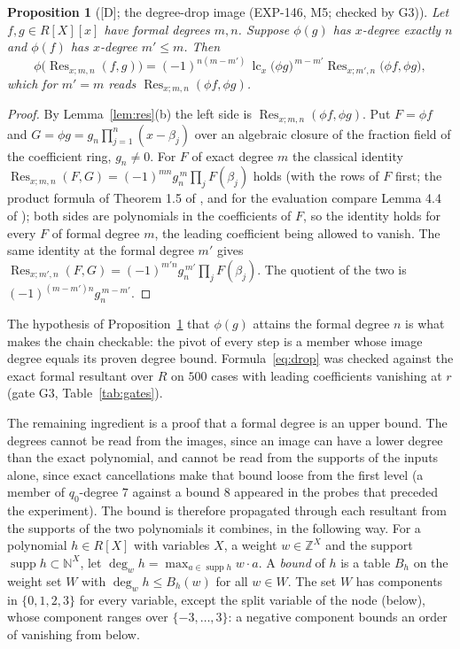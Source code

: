 \documentclass[11pt]{article}
\newtheorem{proposition}[theorem]{Proposition}
\theoremstyle{remark}
\begin{document}
\begin{proposition}[{[D]}; the degree-drop image (EXP-146, M5; checked by G3)]\label{prop:drop}
Let $f,g\in R[X][x]$ have formal degrees $m,n$. Suppose $\phi(g)$ has $x$-degree exactly $n$ and $\phi(f)$ has $x$-degree $m'\le m$. Then
\begin{equation}\label{eq:drop}
\phi\bigl(\operatorname{Res}_{x;m,n}(f,g)\bigr)=(-1)^{n(m-m')}\,\operatorname{lc}_x\bigl(\phi g\bigr)^{\,m-m'}\operatorname{Res}_{x;m',n}\bigl(\phi f,\phi g\bigr),
\end{equation}
which for $m'=m$ reads $\operatorname{Res}_{x;m,n}(\phi f,\phi g)$.
\end{proposition}
\begin{proof}
By Lemma~\ref{lem:res}(b) the left side is $\operatorname{Res}_{x;m,n}(\phi f,\phi g)$. Put $F=\phi f$ and $G=\phi g=g_n\prod_{j=1}^n(x-\beta_j)$ over an algebraic closure of the fraction field of the coefficient ring, $g_n\ne0$. For $F$ of exact degree $m$
the classical identity $\operatorname{Res}_{x;m,n}(F,G)=(-1)^{mn}g_n^{\,m}\prod_jF(\beta_j)$ holds (with the rows of $F$ first; the product formula of Theorem 1.5 of \cite{Enescu2010}, and for the evaluation compare Lemma 4.4 of \cite{Winkler2012}); both sides are polynomials in the coefficients of $F$, so the identity holds for every $F$ of formal degree $m$, the leading coefficient
being allowed to vanish. The same identity at the formal degree $m'$ gives $\operatorname{Res}_{x;m',n}(F,G)=(-1)^{m'n}g_n^{\,m'}\prod_jF(\beta_j)$. The quotient of the two is $(-1)^{(m-m')n}g_n^{\,m-m'}$.
\end{proof}

The hypothesis of Proposition~\ref{prop:drop} that $\phi(g)$ attains the formal degree $n$ is what makes the chain checkable: the pivot of every step is a member whose image degree equals its proven degree bound.
Formula~\eqref{eq:drop} was checked against the exact formal resultant over $R$ on $500$ cases with leading coefficients vanishing at $r$ (gate G3, Table~\ref{tab:gates}).

The remaining ingredient is a proof that a formal degree is an upper bound. The degrees cannot be read from the images, since an image can have a lower degree than the exact polynomial, and cannot be read from the supports of the inputs alone, since exact cancellations make that bound loose from the first level
(a member of $q_0$-degree $7$ against a bound $8$ appeared in the probes that preceded the experiment). The bound is therefore propagated through each resultant from the supports of the two polynomials it combines, in the following way. For a polynomial $h\in R[X]$ with variables $X$, a weight
$w\in\mathbb Z^X$ and the support $\operatorname{supp}h\subset\mathbb N^X$, let $\deg_wh=\max_{a\in\operatorname{supp}h}w\cdot a$. A \emph{bound} of $h$ is a table $B_h$ on the weight set $W$ with $\deg_wh\le B_h(w)$ for all $w\in W$. The set $W$ has components in $\{0,1,2,3\}$
for every variable, except the split variable of the node (below), whose component ranges over $\{-3,\dots,3\}$: a negative component bounds an order of vanishing from below.
\end{document}
